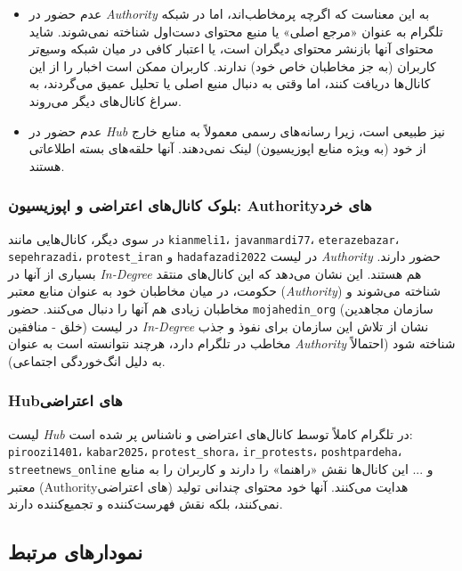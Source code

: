 \documentclass{article}
\begin{document}
	\begin{itemize}
		\item عدم حضور در \textit{Authority} به این معناست که اگرچه پرمخاطب‌اند، اما در شبکه تلگرام به عنوان «مرجع اصلی» یا منبع محتوای دست‌اول شناخته نمی‌شوند. شاید محتوای آنها بازنشر محتوای دیگران است، یا اعتبار کافی در میان شبکه وسیع‌تر کاربران (به جز مخاطبان خاص خود) ندارند. کاربران ممکن است اخبار را از این کانال‌ها دریافت کنند، اما وقتی به دنبال منبع اصلی یا تحلیل عمیق می‌گردند، به سراغ کانال‌های دیگر می‌روند.
		\item عدم حضور در \textit{Hub} نیز طبیعی است، زیرا رسانه‌های رسمی معمولاً به منابع خارج از خود (به ویژه منابع اپوزیسیون) لینک نمی‌دهند. آنها حلقه‌های بسته اطلاعاتی هستند.
	\end{itemize}
	
	\subsubsection*{بلوک کانال‌های اعتراضی و اپوزیسیون: Authorityهای خرد}
	در سوی دیگر، کانال‌هایی مانند \texttt{kianmeli1}، \texttt{javanmardi77}، \texttt{eterazebazar}، \texttt{sepehrazadi}، \texttt{protest\_iran} و \texttt{hadafazadi2022} در لیست \textit{Authority} حضور دارند. بسیاری از آنها در \textit{In-Degree} هم هستند. این نشان می‌دهد که این کانال‌های منتقد حکومت، در میان مخاطبان خود به عنوان منابع معتبر (\textit{Authority}) شناخته می‌شوند و مخاطبان زیادی هم آنها را دنبال می‌کنند. حضور \texttt{mojahedin\_org} (سازمان مجاهدین خلق - منافقین) در لیست \textit{In-Degree} نشان از تلاش این سازمان برای نفوذ و جذب مخاطب در تلگرام دارد، هرچند نتوانسته است به عنوان \textit{Authority} شناخته شود (احتمالاً به دلیل انگ‌خوردگی اجتماعی).
	
	\subsubsection*{Hubهای اعتراضی}
	لیست \textit{Hub} در تلگرام کاملاً توسط کانال‌های اعتراضی و ناشناس پر شده است: \texttt{piroozi1401}، \texttt{kabar2025}، \texttt{protest\_shora}، \texttt{ir\_protests}، \texttt{poshtpardeha}، \texttt{streetnews\_online} و ... این کانال‌ها نقش «راهنما» را دارند و کاربران را به منابع معتبر (Authorityهای اعتراضی) هدایت می‌کنند. آنها خود محتوای چندانی تولید نمی‌کنند، بلکه نقش فهرست‌کننده و تجمیع‌کننده دارند.
	
	\subsection{نمودارهای مرتبط}
	
\end{document}
